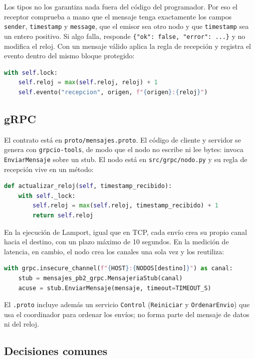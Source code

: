 \documentclass[11pt,a4paper]{article}
\begin{document}
Los tipos no los garantiza nada fuera del código del programador. Por eso el receptor
comprueba a mano que el mensaje tenga exactamente los campos \texttt{sender},
\texttt{timestamp} y \texttt{message}, que el emisor sea otro nodo y que \texttt{timestamp} sea
un entero positivo. Si algo falla, responde \texttt{\{"ok": false, "error": ...\}} y no
modifica el reloj. Con un mensaje válido aplica la regla de recepción y registra el evento
dentro del mismo bloque protegido:

\begin{lstlisting}[language=Python]
with self.lock:
    self.reloj = max(self.reloj, reloj) + 1
    self.evento("recepcion", origen, f"{origen}:{reloj}")
\end{lstlisting}

\subsection{gRPC}

El contrato está en \texttt{proto/\allowbreak mensajes.proto}. El código de cliente y servidor
se genera con \texttt{grpcio-tools}, de modo que el nodo no escribe ni lee bytes: invoca
\texttt{EnviarMensaje} sobre un stub. El nodo está en \texttt{src/\allowbreak grpc/\allowbreak nodo.py} y su
regla de recepción vive en un método:

\begin{lstlisting}[language=Python]
def actualizar_reloj(self, timestamp_recibido):
    with self._lock:
        self.reloj = max(self.reloj, timestamp_recibido) + 1
        return self.reloj
\end{lstlisting}

En la ejecución de Lamport, igual que en TCP, cada envío crea su propio canal hacia el
destino, con un plazo máximo de 10 segundos. En la medición de latencia, en cambio, el nodo
crea los canales una sola vez y los reutiliza:

\begin{lstlisting}[language=Python]
with grpc.insecure_channel(f"{HOST}:{NODOS[destino]}") as canal:
    stub = mensajes_pb2_grpc.MensajeriaStub(canal)
    acuse = stub.EnviarMensaje(mensaje, timeout=TIMEOUT_S)
\end{lstlisting}

El \texttt{.proto} incluye además un servicio \texttt{Control} (\texttt{Reiniciar} y
\texttt{OrdenarEnvio}) que usa el coordinador para ordenar los envíos; no forma parte del
mensaje de datos ni del reloj.

\subsection{Decisiones comunes}
\end{document}
